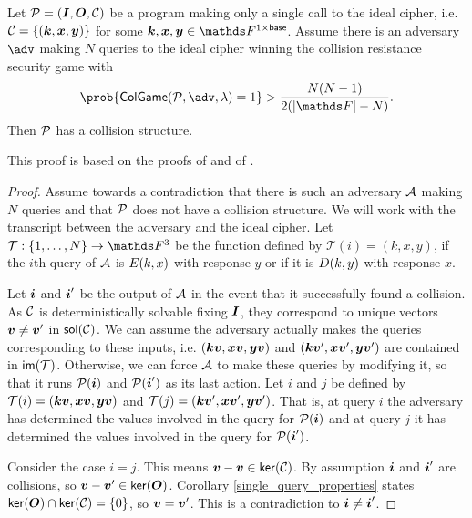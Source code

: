 \begin{prop}
    Let $\P = (\I, \O, \C)$ be a program making only a single call to the ideal cipher,
    i.e. $\C = \{ (\vk, \vx, \vy)\}$ for some $\vk, \vx, \vy \in \Frowsp$.
    Assume there is an adversary $\adv$ making $N$ queries to the ideal cipher winning the collision resistance security game with
    \[
        \prob{\mathsf{ColGame}(\P, \adv, \lambda) = 1 } > \frac{N(N-1)}{2(|\F| - N)}.
    \]
    Then $\P$ has a collision structure.
\end{prop}

This proof is based on the proofs of \cite[Lemma 10]{TCC:McQSwoRos19} and of \cite[Theorem 8.4 (Davies-Meyer)]{Boneh2015CourseIA}.

\begin{proof}
    Assume towards a contradiction that there is such an adversary $\A$ making $N$ queries
    and that $\P$ does not have a collision structure.
    We will work with the transcript between the adversary and the ideal cipher.
    Let $\mathcal{T}: \{1, \dots, N\} \to \F^3$ be the function defined by $\mathcal{T}(i) = (k, x, y)$,
    if the $i$th query of $\A$ is $\E(k, x)$ with response $y$ or if it is $\D(k, y)$ with response $x$.

    Let $\v i$ and $\v i'$ be the output of $\A$ in the event that it successfully found a collision.
    As $\C$ is deterministically solvable fixing $\I$, they correspond to unique vectors $\vv \neq \vv'$ in $\sol(\C)$.
    We can assume the adversary actually makes the queries corresponding to these inputs,
    i.e. $(\vk \vv, \vx \vv, \vy \vv)$ and $(\vk \vv', \vx \vv', \vy \vv')$ are contained in $\im(\mathcal{T})$.
    Otherwise, we can force $\A$ to make these queries by modifying it,
    so that it runs $\P(\v i)$ and $\P(\v i')$ as its last action.
    Let $i$ and $j$ be defined by $\mathcal{T}(i) = (\vk \vv, \vx \vv, \vy \vv)$
    and $\mathcal{T}(j) = (\vk \vv', \vx \vv', \vy \vv')$. 
    That is, at query $i$ the adversary has determined the values involved in the query for $\P(\v i)$ and
    at query $j$ it has determined the values involved in the query for $\P(\v i')$.
    
    Consider the case $i = j$.
    This means $\vv - \vv \in \ker(\C)$.
    By assumption $\v i$ and $\v i'$ are collisions, so $\vv - \vv' \in \ker(\O)$.
    Corollary \ref{single_query_properties} states $\ker(\O) \cap \ker(\C) = \{0\}$,
    so $\vv = \vv'$. 
    This is a contradiction to $\v i \neq \v i'$.
    

\end{proof}
